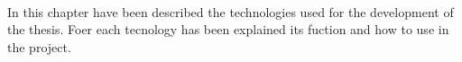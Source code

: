 \paragraph{}
In this chapter have been described the technologies used for the development of the thesis. Foer each tecnology has been explained its fuction and how to use in the project.